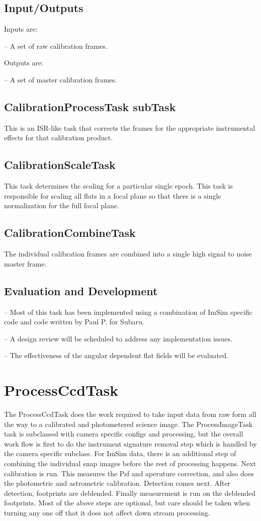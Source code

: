 \documentclass[12pt]{article}
\begin{document}
\subsection{Input/Outputs}
Inputs are:

-- A set of raw calibration frames.

Outputs are:

-- A set of master calibration frames.

\subsection{CalibrationProcessTask subTask}
This is an ISR-like task that corrects the frames for the appropriate instrumental effects for that calibration
product.

\subsection{CalibrationScaleTask}
This task determines the scaling for a particular single epoch.  This task is responsible for
scaling all flats in a focal plane so that there is a single normalization for the full focal plane.

\subsection{CalibrationCombineTask}
The individual calibration frames are combined into a single high signal to noise master frame. 

\subsection{Evaluation and Development}
-- Most of this task has been implemented using a combination of ImSim specific code and code written by Paul P. for Subaru.

-- A design review will be scheduled to address any implementation issues.

-- The effectiveness of the angular dependent flat fields will be evaluated.



\clearpage 
\section{ProcessCcdTask\label{processccdsec}} 
The ProcessCcdTask does the work required to take input data from raw form all the way to a calibrated and
photometered science image.  The ProcessImageTask task is subclassed with camera specific configs and processing, but the overall 
work flow is first to do the instrument signature removal step which is handled by the camera specific subclass.  For ImSim
data, there is an additional step of combining the individual snap images before the rest of processing happens. Next calibration
is run.  This measures the Psf and aperuture correction, and also does the photometric and astrometric calibration.  
Detection comes next.  After detection, footprints are deblended.
Finally measurement is run on the deblended footprints.  Most of the above steps are optional, but care should be taken
when turning any one off that it does not affect down stream processing.
\end{document}
